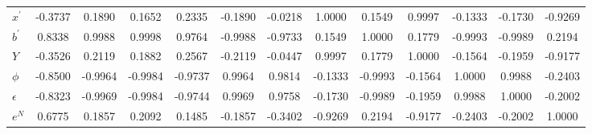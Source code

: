 \begin{center}
\begin{longtable}{lcccccccccccc}
$x^\prime   $	 & 	     -0.3737	 & 	      0.1890	 & 	      0.1652	 & 	      0.2335	 & 	     -0.1890	 & 	     -0.0218	 & 	      1.0000	 & 	      0.1549	 & 	      0.9997	 & 	     -0.1333	 & 	     -0.1730	 & 	     -0.9269 \\ 
$b^\prime   $	 & 	      0.8338	 & 	      0.9988	 & 	      0.9998	 & 	      0.9764	 & 	     -0.9988	 & 	     -0.9733	 & 	      0.1549	 & 	      1.0000	 & 	      0.1779	 & 	     -0.9993	 & 	     -0.9989	 & 	      0.2194 \\ 
$Y          $	 & 	     -0.3526	 & 	      0.2119	 & 	      0.1882	 & 	      0.2567	 & 	     -0.2119	 & 	     -0.0447	 & 	      0.9997	 & 	      0.1779	 & 	      1.0000	 & 	     -0.1564	 & 	     -0.1959	 & 	     -0.9177 \\ 
$\phi       $	 & 	     -0.8500	 & 	     -0.9964	 & 	     -0.9984	 & 	     -0.9737	 & 	      0.9964	 & 	      0.9814	 & 	     -0.1333	 & 	     -0.9993	 & 	     -0.1564	 & 	      1.0000	 & 	      0.9988	 & 	     -0.2403 \\ 
$\epsilon   $	 & 	     -0.8323	 & 	     -0.9969	 & 	     -0.9984	 & 	     -0.9744	 & 	      0.9969	 & 	      0.9758	 & 	     -0.1730	 & 	     -0.9989	 & 	     -0.1959	 & 	      0.9988	 & 	      1.0000	 & 	     -0.2002 \\ 
$e^N        $	 & 	      0.6775	 & 	      0.1857	 & 	      0.2092	 & 	      0.1485	 & 	     -0.1857	 & 	     -0.3402	 & 	     -0.9269	 & 	      0.2194	 & 	     -0.9177	 & 	     -0.2403	 & 	     -0.2002	 & 	      1.0000 \\ 
\end{longtable}
 \end{center}
